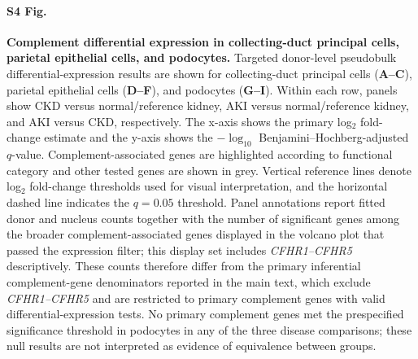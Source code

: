\documentclass[10pt,letterpaper]{article}
\begin{document}
\paragraph*{S4 Fig.}
\label{S4_Fig}
\textbf{Complement differential expression in collecting-duct principal cells, parietal epithelial cells, and podocytes.}
Targeted donor-level pseudobulk differential-expression results are shown for collecting-duct principal cells (\textbf{A--C}), parietal epithelial cells (\textbf{D--F}), and podocytes (\textbf{G--I}). Within each row, panels show CKD versus normal/reference kidney, AKI versus normal/reference kidney, and AKI versus CKD, respectively. The x-axis shows the primary log$_2$ fold-change estimate and the y-axis shows the $-\log_{10}$ Benjamini--Hochberg-adjusted $q$-value. Complement-associated genes are highlighted according to functional category and other tested genes are shown in grey. Vertical reference lines denote log$_2$ fold-change thresholds used for visual interpretation, and the horizontal dashed line indicates the $q=0.05$ threshold. Panel annotations report fitted donor and nucleus counts together with the number of significant genes among the broader complement-associated genes displayed in the volcano plot that passed the expression filter; this display set includes \textit{CFHR1--CFHR5} descriptively. These counts therefore differ from the primary inferential complement-gene denominators reported in the main text, which exclude \textit{CFHR1--CFHR5} and are restricted to primary complement genes with valid differential-expression tests. No primary complement genes met the prespecified significance threshold in podocytes in any of the three disease comparisons; these null results are not interpreted as evidence of equivalence between groups.
\end{document}
